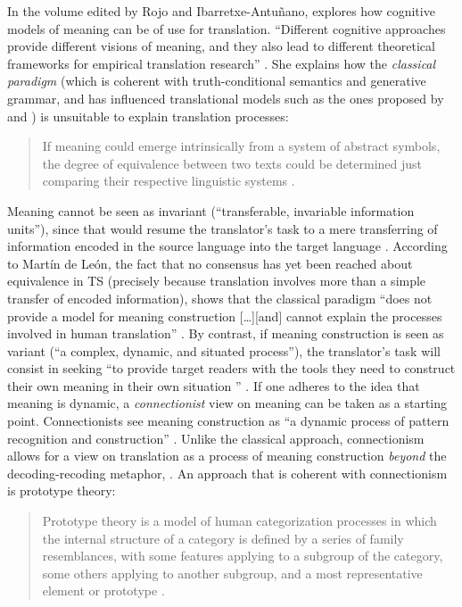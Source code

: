 In the volume edited by Rojo and Ibarretxe-Antuñano, \citet{rojo_who_2013} explores how cognitive models of meaning can be of use for translation. “Different cognitive approaches provide different visions of meaning, and they also lead to different theoretical frameworks for empirical translation research” \citep[99]{rojo_who_2013}. She explains how the \textit{classical} \textit{paradigm} (which is coherent with truth-conditional semantics and generative grammar, and has influenced translational models such as the ones proposed by \citealt{nida_toward_1964} and \citealt{kade_zufall_1968}) is unsuitable to explain translation processes:

\begin{quote}
If meaning could emerge intrinsically from a system of abstract symbols, the degree of equivalence between two texts could be determined just comparing their respective linguistic systems \citep[103]{rojo_who_2013}.
\end{quote}

Meaning cannot be seen as invariant (“transferable, invariable information units”), since that would resume the translator’s task to a mere transferring of information encoded in the source language into the target language \citep[99]{rojo_who_2013}. According to Martín de León, the fact that no consensus has yet been reached about equivalence in TS (precisely because translation involves more than a simple transfer of encoded information), shows that the classical paradigm “does not provide a model for meaning construction […][and] cannot explain the processes involved in human translation” \citep[103]{rojo_who_2013}. By contrast, if meaning construction is seen as variant (“a complex, dynamic, and situated process”), the translator’s task will consist in seeking “to provide target readers with the tools they need to construct their own meaning in their own situation \citep{risku_translationsmanagement._2004}” \citep[99]{rojo_who_2013}. If one adheres to the idea that meaning is dynamic, a \textit{connectionist} view on meaning can be taken as a starting point. Connectionists see meaning construction as “a dynamic process of pattern recognition and construction” \citep[100]{rojo_who_2013}. Unlike the classical approach, connectionism allows for a view on translation as a process of meaning construction \textit{beyond} the decoding-recoding metaphor, \citep[105]{rojo_who_2013}. An approach that is coherent with connectionism is prototype theory:

\begin{quote}
Prototype theory is a model of human categorization processes in which the internal structure of a category is defined by a series of family resemblances, with some features applying to a subgroup of the category, some others applying to another subgroup, and a most representative element or prototype \citep[106]{rojo_who_2013}.
\end{quote}

